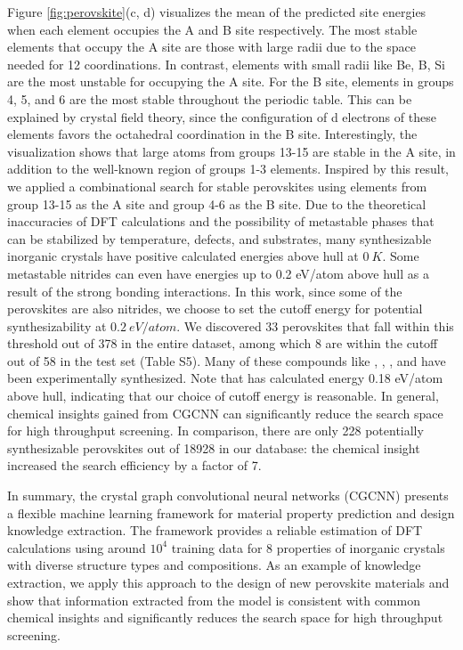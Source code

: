 \documentclass[twocolumn, prl]{revtex4-1}
\begin{document}
Figure \ref{fig:perovskite}(c, d) visualizes the mean of the predicted site energies when each element occupies the A and B site respectively. The most stable elements that occupy the A site are those with large radii due to the space needed for 12 coordinations. In contrast, elements with small radii like Be, B, Si are the most unstable for occupying the A site. For the B site, elements in groups 4, 5, and 6 are the most stable throughout the periodic table. This can be explained by crystal field theory, since the configuration of d electrons of these elements favors the octahedral coordination in the B site. Interestingly, the visualization shows that large atoms from groups 13-15 are stable in the A site, in addition to the well-known region of groups 1-3 elements. Inspired by this result, we applied a combinational search for stable perovskites using elements from group 13-15 as the A site and group 4-6 as the B site. Due to the theoretical inaccuracies of DFT calculations and the possibility of metastable phases that can be stabilized by temperature, defects, and substrates, many synthesizable inorganic crystals have positive calculated energies above hull at $\SI{0}{K}$. Some metastable nitrides can even have energies up to 0.2 eV/atom above hull as a result of the strong bonding interactions\cite{sun2016thermodynamic}. In this work, since some of the perovskites are also nitrides, we choose to set the cutoff energy for potential synthesizability at $\SI{0.2}{eV/atom}$. We discovered 33 perovskites that fall within this threshold out of 378 in the entire dataset, among which 8 are within the cutoff out of 58 in the test set (Table S5). Many of these compounds like \cite{shirane1952phase}, \cite{shirane1952phase}, \cite{lang2016improved}, and \cite{takatsu2017cubic} have been experimentally synthesized. Note that  has calculated energy 0.18 eV/atom above hull, indicating that our choice of cutoff energy is reasonable. In general, chemical insights gained from CGCNN can significantly reduce the search space for high throughput screening. In comparison, there are only 228 potentially synthesizable perovskites out of 18928 in our database: the chemical insight increased the search efficiency by a factor of 7.

In summary, the crystal graph convolutional neural networks (CGCNN) presents a flexible machine learning framework for material property prediction and design knowledge extraction. The framework provides a reliable estimation of DFT calculations using around $10^4$ training data for 8 properties of inorganic crystals with diverse structure types and compositions. As an example of knowledge extraction, we apply this approach to the design of new perovskite materials and show that information extracted from the model is consistent with common chemical insights and significantly reduces the search space for high throughput screening. 
\end{document}
